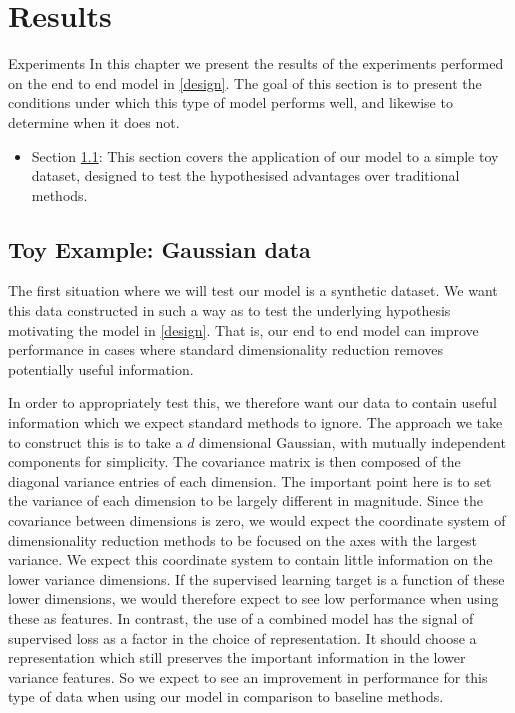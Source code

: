 \chapter{Results}
\label{cha:result}
Experiments 
In this chapter we present the results of the experiments performed on the end to end model in \ref{design}. The goal of this section is to  present the conditions under which this type of model performs well, and likewise to determine when it does not. 

\begin{itemize}
    \item Section \ref{toygauss}: This section covers the application of our model to a simple toy dataset, designed to test the hypothesised advantages over traditional methods.
    
 
\end{itemize} \pagebreak



\section{Toy Example: Gaussian data}
\label{toygauss}
The first situation where we will test our model is a synthetic dataset. We want this data constructed in such a way as to test the underlying hypothesis motivating the model in \ref{design}. That is, our end to end model can improve performance in cases where standard dimensionality reduction removes potentially useful information.

In order to appropriately test this, we therefore want our data to contain useful information which we expect standard methods to ignore. The approach we take to construct this is to take a $d$ dimensional Gaussian, with mutually independent components for simplicity. The covariance matrix is then composed of the diagonal variance entries of each dimension. The important point here is to set the variance of each dimension to be largely different in magnitude. Since the covariance between dimensions is zero, we would expect the coordinate system of dimensionality reduction methods to be focused on the axes with the largest variance. We expect this coordinate system to contain little information on the lower variance dimensions.  If the supervised learning target is a function of these lower dimensions, we would therefore expect to see low performance when using these as features. In contrast, the use of a combined model has the signal of supervised loss as a factor in the choice of representation. It should choose a representation which still preserves the important information in the lower variance features. So we expect to see an improvement in performance for this type of data when using our model in comparison to baseline methods. \\

